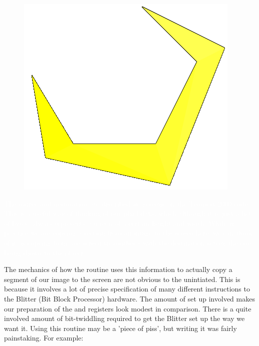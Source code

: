 \begin{definition}
\setlength{\intextsep}{0pt}%
\setlength{\columnsep}{3pt}%
\begin{figure}
\includegraphics[width=\linewidth]{src/callout/clawt2k_t.png} 
\end{figure}
\small
\textcolor{white}{
  The source and destination are described as 'screens' in the Tempest 2000 code. This is a useful way of thinking of our pixel data, which
  although it is just a list of bytes, always represents a screen of a certain height and width. While in practice we are copying a section from an image
  to the screen here, we can think of it as copying from one screen to another - with the destination screen the one being shown to the player.
}
\end{definition}

The mechanics of how the  routine uses this information to actually copy a segment of our image
to the screen are not obvious to the unintiated. This is because it involves a lot of precise specification of many different
instructions to the Blitter (Bit Block Processor) hardware. The amount of set up involved makes our preparation of the 
and  registers look modest in comparison. There is a quite involved amount of bit-twiddling required to get the Blitter
set up the way we want it. Using this routine may be a 'piece of piss', but writing it was fairly painstaking. For example:

